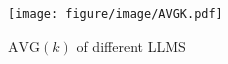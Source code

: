 \begin{figure}[h]
    \centering
    \texttt{[image: figure/image/AVGK.pdf]}
    \caption{\(\text{AVG}(k)\) of different LLMS}
    \label{fig:avg}

\end{figure}
